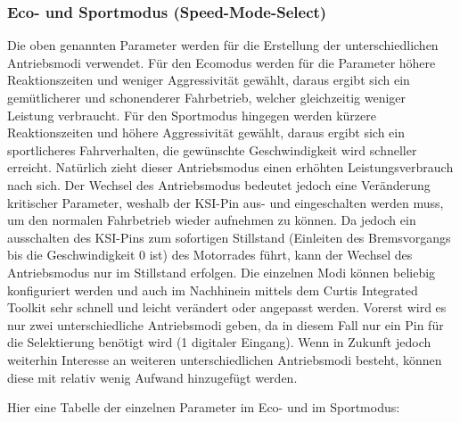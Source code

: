 \newpage

\subsubsection{Eco- und Sportmodus (Speed-Mode-Select)}
Die oben genannten Parameter werden für die Erstellung der unterschiedlichen Antriebsmodi verwendet. Für den Ecomodus werden für die Parameter höhere Reaktionszeiten und weniger Aggressivität gewählt, daraus ergibt sich ein gemütlicherer und schonenderer Fahrbetrieb, welcher gleichzeitig weniger Leistung verbraucht. Für den Sportmodus hingegen werden kürzere Reaktionszeiten und höhere Aggressivität gewählt, daraus ergibt sich ein sportlicheres Fahrverhalten, die gewünschte Geschwindigkeit wird schneller erreicht. Natürlich zieht dieser Antriebsmodus einen erhöhten Leistungsverbrauch nach sich. Der Wechsel des Antriebsmodus bedeutet jedoch eine Veränderung kritischer Parameter, weshalb der KSI-Pin aus- und eingeschalten werden muss, um den normalen Fahrbetrieb wieder aufnehmen zu können. Da jedoch ein ausschalten des KSI-Pins zum sofortigen Stillstand (Einleiten des Bremsvorgangs bis die Geschwindigkeit 0 ist) des Motorrades führt, kann der Wechsel des Antriebsmodus nur im Stillstand erfolgen. Die einzelnen Modi können beliebig konfiguriert werden und auch im Nachhinein mittels dem Curtis Integrated Toolkit sehr schnell und leicht verändert oder angepasst werden. Vorerst wird es nur zwei unterschiedliche Antriebsmodi geben, da in diesem Fall nur ein Pin für die Selektierung benötigt wird (1 digitaler Eingang). Wenn in Zukunft jedoch weiterhin Interesse an weiteren unterschiedlichen Antriebsmodi besteht, können diese mit relativ wenig Aufwand hinzugefügt werden.

\vspace{5mm}

Hier eine Tabelle der einzelnen Parameter im Eco- und im Sportmodus:

\vspace{2mm}

